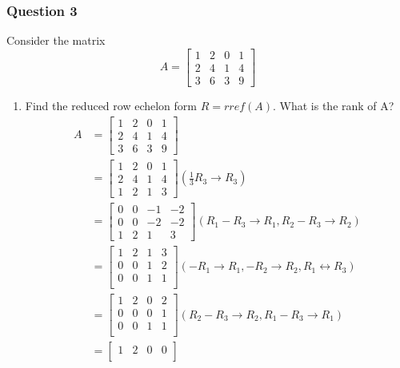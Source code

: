 \documentclass{math}
\begin{document}
\subsubsection*{Question 3}
Consider the matrix
\[ A = \begin{bmatrix}
  1 & 2 & 0 & 1 \\
  2 & 4 & 1 & 4 \\
  3 & 6 & 3 & 9
\end{bmatrix} \]
\begin{enumerate}
  \item Find the reduced row echelon form \( R = rref(A) \). What is the rank
    of A?
  \begin{align*}
    A &= \begin{bmatrix}
      1 & 2 & 0 & 1 \\
      2 & 4 & 1 & 4 \\
      3 & 6 & 3 & 9
    \end{bmatrix} \\
    &= \begin{bmatrix}
      1 & 2 & 0 & 1 \\
      2 & 4 & 1 & 4 \\
      1 & 2 & 1 & 3
    \end{bmatrix} (\frac{1}{3}R_3 \to R_3) \\
    &= \begin{bmatrix}
      0 & 0 & -1 & -2 \\
      0 & 0 & -2 & -2 \\
      1 & 2 & 1 & 3
    \end{bmatrix} (R_1-R_3 \to R_1, R_2-R_3 \to R_2) \\
    &= \begin{bmatrix}
      1 & 2 & 1 & 3 \\
      0 & 0 & 1 & 2 \\
      0 & 0 & 1 & 1 \\
    \end{bmatrix} (-R_1 \to R_1,-R_2 \to R_2, R_1 \leftrightarrow R_3) \\
    &= \begin{bmatrix}
      1 & 2 & 0 & 2 \\
      0 & 0 & 0 & 1 \\
      0 & 0 & 1 & 1 \\
    \end{bmatrix} (R_2-R_3 \to R_2, R_1-R_3 \to R_1) \\
    &= \begin{bmatrix}
      1 & 2 & 0 & 0 \\

\end{bmatrix}
\end{align*}
\end{enumerate}
\end{document}
